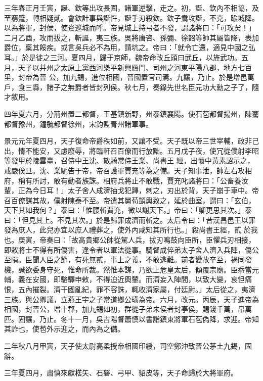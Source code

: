 \begin{pinyinscope}
 三年春正月壬寅，誕、欽等出攻長圍，諸軍逆擊，走之。初，誕、欽內不相協，及至窮蹙，轉相疑貳。會欽計事與誕忤，誕手刃殺欽。欽子鴦攻誕，不克，踰城降。以為將軍，封侯，使鴦巡城而呼。帝見城上持弓者不發，謂諸將曰：「可攻矣！」二月乙酉，攻而拔之，斬誕，夷三族。吳將唐咨、孫彌、徐韶等帥其屬皆降，表加爵位，稟其餒疾。或言吳兵必不為用，請坑之。帝曰：「就令亡還，適見中國之弘耳。」於是徙之三河。夏四月，歸于京師，魏帝命改丘頭曰武丘，以旌武功。五月，天子以并州之太原上黨西河樂平新興鴈門、司州之河東平陽八郡，地方七百里，封帝為晉
 公，加九錫，進位相國，晉國置官司焉。九讓，乃止。於是增邑萬戶，食三縣，諸子之無爵者皆封列侯。秋七月，奏錄先世名臣元功大勳之子了，隨才敘用。



 四年夏六月，分荊州置二都督，王基鎮新野，州泰鎮襄陽。使石苞都督揚州，陳騫都督豫州，鐘毓都督徐州，宋鈞監青州諸軍事。



 景元元年夏四月，天子復命帝爵秩如前，又讓不受。天子既以帝三世宰輔，政非己出，情不能安，又慮廢辱，將臨軒召百僚而行放黜。五月戊子夜，使冗從僕射李昭等發甲於陵雲臺，召侍中王沈、散騎常侍王業、尚書王
 經，出懷中黃素詔示之，戒嚴俟旦。沈、業馳告于帝，帝召護軍賈充等為之備。天子知事泄，帥左右攻相府，稱有所討，敢有動者族誅。相府兵將止不敢戰，賈充叱諸將曰：「公畜養汝輩，正為今日耳！」太子舍人成濟抽戈犯蹕，刺之，刃出於背，天子崩于車中。帝召百僚謀其故，僕射陳泰不至。帝遣其舅荀顗輿致之，延於曲室，謂曰：「玄伯，天下其如我何？」泰曰：「惟腰斬賈充，微以謝天下。」帝曰：「卿更思其次。」泰曰：「但見其上。不見其次。」於是歸罪成濟而斬之。太后令曰：「昔漢昌邑王以罪發為庶人，此兒亦宜以庶人禮葬之，使外內咸知其所行也。」殺尚書王經，貳
 於我也。庚寅，帝奏曰：「故高貴鄉公帥從駕人兵，拔刃鳴鼓向臣所，臣懼兵刃相接，即敕將士不得有所傷害，違令者以軍法從事。騎督成倅弟太子舍人濟入兵陣，傷公至隕。臣聞人臣之節，有死無貳，事上之義，不敢逃難。前者變故卒至，禍同發機，誠欲委身守死，惟命所裁。然惟本謀，乃欲上危皇太后，傾覆宗廟。臣忝當元輔，義在安國，即駱驛申敕，不得迫近輿輦。而濟妄入陣間，以致大變，哀怛痛恨，五內摧裂。濟干國亂紀，罪不容誅，輒收濟家屬，付廷尉。」太后從之，夷濟三族。與公卿議，立燕王宇之子常道鄉公璜為帝。六月，改元。丙辰，天子進帝為
 相國，封晉公，增十郡，加九錫如初，群從子弟未侯者封亭侯，賜錢千萬，帛萬匹。固讓，乃止。冬十一月，吳吉陽督蕭慎以書詣鎮東將軍石苞偽降，求迎。帝知其詐也，使苞外示迎之，而內為之備。



 二年秋八月甲寅，天子使太尉高柔授帝相國印綬，司空鄭沖致晉公茅土九錫，固辭。



 三年夏四月，肅慎來獻楛矢、石砮、弓甲、貂皮等，天子命歸於大將軍府。




\end{pinyinscope}
